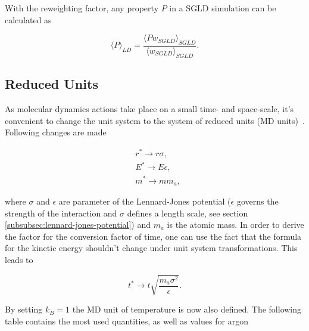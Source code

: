 \documentclass[a4paper]{article}
\begin{document}
With the reweighting factor, any property $P$ in a SGLD simulation can be calculated as

\begin{equation}
\langle P \rangle_{LD} = \frac{\langle P w_{SGLD} \rangle_{SGLD}}{\langle w_{SGLD} \rangle_{SGLD}}.
\label{eq:quantity_reweighting}
\end{equation}

\subsection{Reduced Units}

As molecular dynamics actions take place on a small time- and space-scale, it's convenient to change the unit system to the system of reduced units (MD units)~\cite{Rapaport2004}. Following changes are made

\begin{align}
& r^*\rightarrow r \sigma, \\
& E^* \rightarrow E \epsilon, \\
& m^* \rightarrow m m_a,
\end{align}

where $\sigma$ and $\epsilon$ are parameter of the Lennard-Jones potential ($\epsilon$ governs the strength of the interaction and $\sigma$ defines a length scale, see section \ref{subsubsec:lennard-jones-potential}) and $m_a$ is the atomic mass. In order to derive the factor for the conversion factor of time, one can use the fact that the formula for the kinetic energy shouldn't change under unit system transformations. This leads to

\begin{equation}
t^* \rightarrow t \sqrt{\frac{m_a \sigma^2}{\epsilon}}.
\label{eq:scale_time}
\end{equation}

By setting $k_B = 1$ the MD unit of temperature is now also defined. The following table contains the most used quantities, as well as values for argon~\cite{Rapaport2004}

\vspace{12pt}
\end{document}
